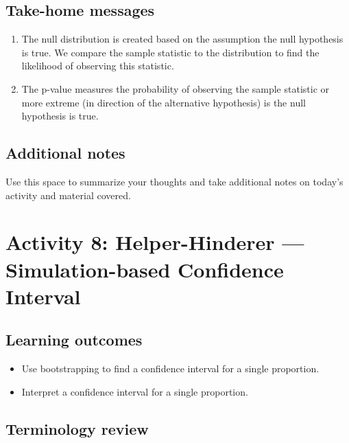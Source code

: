 \documentclass[
]{report}
\begin{document}

\subsection{Take-home messages}\label{take-home-messages-6}

\begin{enumerate}
\def\labelenumi{\arabic{enumi}.}
\item
  The null distribution is created based on the assumption the null hypothesis is true. We compare the sample statistic to the distribution to find the likelihood of observing this statistic.
\item
  The p-value measures the probability of observing the sample statistic or more extreme (in direction of the alternative hypothesis) is the null hypothesis is true.
\end{enumerate}

\subsection{Additional notes}\label{additional-notes-6}

Use this space to summarize your thoughts and take additional notes on today's activity and material covered.

\newpage

\section{Activity 8: Helper-Hinderer --- Simulation-based Confidence Interval}\label{activity-8-helper-hinderer-simulation-based-confidence-interval}


\subsection{Learning outcomes}\label{learning-outcomes-7}

\begin{itemize}
\item
  Use bootstrapping to find a confidence interval for a single proportion.
\item
  Interpret a confidence interval for a single proportion.
\end{itemize}

\subsection{Terminology review}\label{terminology-review-6}
\end{document}
